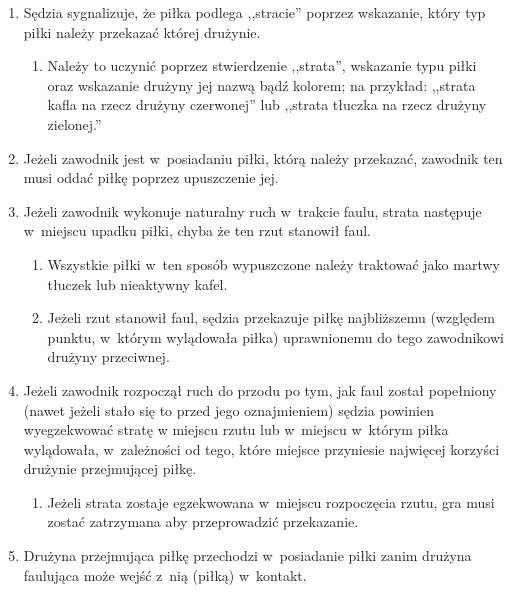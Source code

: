\documentclass[12pt,a4paper]{article}
\begin{document}
\begin{enumerate}
	\item
	      Sędzia sygnalizuje, że piłka podlega ,,stracie'' poprzez wskazanie,
	      który typ piłki należy przekazać której drużynie.

	      \begin{enumerate}
		      \item
		            Należy to uczynić poprzez stwierdzenie ,,strata'', wskazanie typu
		            piłki oraz wskazanie drużyny jej nazwą bądź kolorem; na przykład:
		            ,,strata kafla na rzecz drużyny czerwonej'' lub ,,strata tłuczka na
		            rzecz drużyny zielonej.''
	      \end{enumerate}
	\item
	      Jeżeli zawodnik jest w~posiadaniu piłki, którą należy przekazać,
	      zawodnik ten musi oddać piłkę poprzez upuszczenie jej.
	\item
	      Jeżeli zawodnik wykonuje naturalny ruch w~trakcie faulu, strata
	      następuje w~miejscu upadku piłki, chyba że ten rzut stanowił faul.

	      \begin{enumerate}
		      \item
		            Wszystkie piłki w~ten sposób wypuszczone należy traktować jako
		            martwy tłuczek lub nieaktywny kafel.
		      \item
		            Jeżeli rzut stanowił faul, sędzia przekazuje piłkę najbliższemu
		            (względem punktu, w~którym wylądowała piłka) uprawnionemu do tego
		            zawodnikowi drużyny przeciwnej.
	      \end{enumerate}
	\item
	      Jeżeli zawodnik rozpoczął ruch do przodu po tym, jak faul
	      został popełniony (nawet jeżeli stało się to przed jego oznajmieniem)
	      sędzia powinien wyegzekwować stratę w miejscu rzutu lub w~miejscu w~którym piłka wylądowała, w~zależności od tego, które miejsce
	      przyniesie najwięcej korzyści drużynie przejmującej piłkę.

	      \begin{enumerate}
		      \item
		            Jeżeli strata zostaje egzekwowana w~miejscu rozpoczęcia rzutu, gra
		            musi zostać zatrzymana aby przeprowadzić przekazanie.
	      \end{enumerate}
	\item
	      Drużyna przejmująca piłkę przechodzi w~posiadanie piłki zanim drużyna
	      faulująca może wejść z~nią (piłką) w~kontakt.


\end{enumerate}
\end{document}
